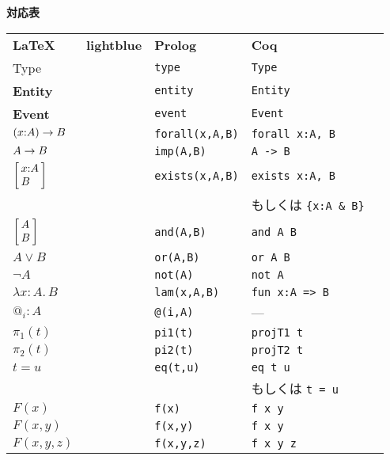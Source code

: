 \documentclass{article}
\newcommand{\dPi}[3][x]{\ensuremath{%
  \left( 
  #1{:}#2 
  \right) \to #3
  }}
\newcommand{\dSigma}[3][x]{\ensuremath{%
  \left[\kern-0.3em
  \begin{array}{l}
  #1{:}#2 \\
  #3
  \end{array}
  \kern-0.3em\right]
  }}
\newcommand{\dConj}[3][x]{\ensuremath{%
  \left[\kern-0.3em
  \begin{array}{l}
  #2 \\
  #3
  \end{array}
  \kern-0.3em\right]
  }}
\newcommand{\dImp}[3][x]{\ensuremath{%
  #2 \to #3
  }}
\begin{document}
\large

\begin{center}
{\Large\textbf{対応表}}
\end{center}

\bigskip

\begin{tabular}{lllll}
\medskip
\textbf{\LaTeX} & \textbf{lightblue} & \textbf{Prolog} & \textbf{Coq} \\
\medskip
Type & & \verb|type| & \verb|Type| \\
\medskip
\textbf{Entity} & & \verb|entity| & \verb|Entity| \\
\medskip
\textbf{Event} & & \verb|event| & \verb|Event| \\
\medskip
$\dPi[x]{A}{B}$ & & \verb|forall(x,A,B)|  & \verb|forall x:A, B| &\\
\medskip
$\dImp[x]{A}{B}$ & & \verb|imp(A,B)|  & \verb|A -> B| &\\
\medskip
$\dSigma[x]{A}{B}$ & & \verb|exists(x,A,B)| & \verb|exists x:A, B| &\\
\medskip
                               &  &                                & {\normalsize もしくは} \verb|{x:A & B}| \\
\medskip
$\dConj{A}{B}$ & & \verb|and(A,B)| & \verb|and A B| &\\
\medskip
$A \vee B$ & & \verb|or(A,B)| & \verb|or A B| &\\
\medskip
$\neg A$ & & \verb|not(A)| & \verb|not A| &\\
\medskip
$\lambda x : A.\, B$ & & \verb|lam(x,A,B)| & \verb|fun x:A => B| &\\
\medskip
$@_i : A$ & & \verb|@(i,A)| & --- &\\
\medskip
$\pi_1(t)$ & & \verb|pi1(t)| & \verb|projT1 t| &\\
\medskip
$\pi_2(t)$ & & \verb|pi2(t)| & \verb|projT2 t| &\\
\medskip
$t = u$ & & \verb|eq(t,u)| & \verb|eq t u| &\\
            &  &                      & {\normalsize もしくは} \verb|t = u| & \\
$F(x)$ & & \verb|f(x)| & \verb|f x y| \\
$F(x,y)$ & & \verb|f(x,y)| & \verb|f x y| \\
$F(x,y,z)$ & & \verb|f(x,y,z)| & \verb|f x y z|
\end{tabular}
\end{document}
